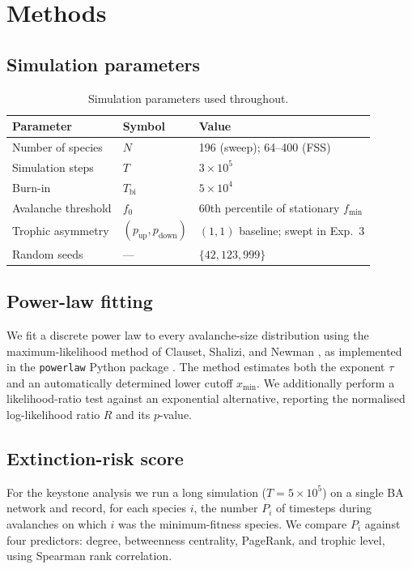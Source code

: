 \documentclass[11pt,a4paper]{article}
\begin{document}
\section{Methods}\label{sec:methods}

\subsection{Simulation parameters}
\begin{table}[H]
\centering\small
\begin{tabular}{lll}
\toprule
Parameter & Symbol & Value \\
\midrule
Number of species & $N$ & 196 (sweep); 64--400 (FSS) \\
Simulation steps & $T$ & $3 \times 10^5$ \\
Burn-in & $T_{\text{bi}}$ & $5 \times 10^4$ \\
Avalanche threshold & $f_0$ & 60th percentile of stationary $f_{\min}$ \\
Trophic asymmetry & $(p_{\text{up}}, p_{\text{down}})$ & $(1,1)$ baseline; swept in Exp.~3 \\
Random seeds & --- & $\{42, 123, 999\}$ \\
\bottomrule
\end{tabular}
\caption{Simulation parameters used throughout.}
\end{table}

\subsection{Power-law fitting}
We fit a discrete power law to every avalanche-size distribution using the maximum-likelihood method of Clauset, Shalizi, and Newman \citep{clauset2009power}, as implemented in the \texttt{powerlaw} Python package \citep{alstott2014powerlaw}. The method estimates both the exponent $\tau$ and an automatically determined lower cutoff $x_{\min}$. We additionally perform a likelihood-ratio test against an exponential alternative, reporting the normalised log-likelihood ratio $R$ and its $p$-value.

\subsection{Extinction-risk score}
For the keystone analysis we run a long simulation ($T = 5 \times 10^5$) on a single BA network and record, for each species $i$, the number $P_i$ of timesteps during avalanches on which $i$ was the minimum-fitness species. We compare $P_i$ against four predictors: degree, betweenness centrality, PageRank, and trophic level, using Spearman rank correlation.
\end{document}
